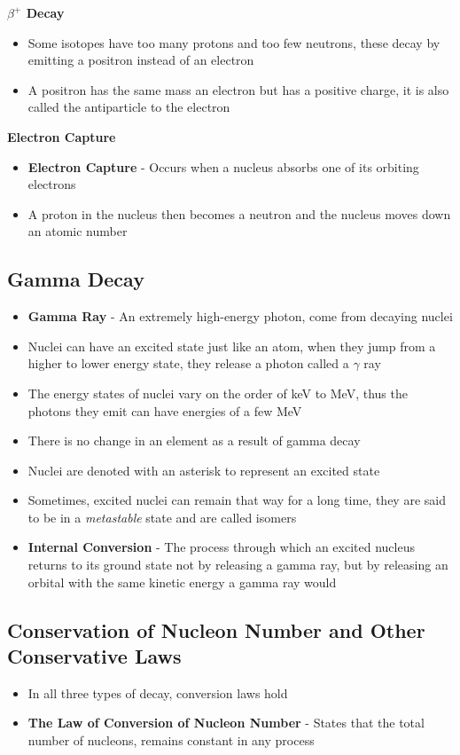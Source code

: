 \textbf{\(\beta^+\) Decay}
\begin{itemize}
    \item Some isotopes have too many protons and too few neutrons, these decay by emitting a positron instead of an electron
    \item A positron has the same mass an electron but has a positive charge, it is also called the antiparticle to the electron
\end{itemize}

\textbf{Electron Capture}
\begin{itemize}
    \item \textbf{Electron Capture} - Occurs when a nucleus absorbs one of its orbiting electrons
    \item A proton in the nucleus then becomes a neutron and the nucleus moves down an atomic number
\end{itemize}

\subsection{Gamma Decay}
\begin{itemize}
    \item \textbf{Gamma Ray} - An extremely high-energy photon, come from decaying nuclei
    \item Nuclei can have an excited state just like an atom, when they jump from a higher to lower energy state, they release a photon called a \(\gamma\) ray
    \item The energy states of nuclei vary on the order of keV to MeV, thus the photons they emit can have energies of a few MeV
    \item There is no change in an element as a result of gamma decay
    \item Nuclei are denoted with an asterisk to represent an excited state
    \item Sometimes, excited nuclei can remain that way for a long time, they are said to be in a \emph{metastable} state and are called isomers
    \item \textbf{Internal Conversion} - The process through which an excited nucleus returns to its ground state not by releasing a gamma ray, but by releasing an orbital with the same kinetic energy a gamma ray would
\end{itemize}

\subsection{Conservation of Nucleon Number and Other Conservative Laws}
\begin{itemize}
    \item In all three types of decay, conversion laws hold
    \item \textbf{The Law of Conversion of Nucleon Number} - States that the total number of nucleons, remains constant in any process
\end{itemize}

